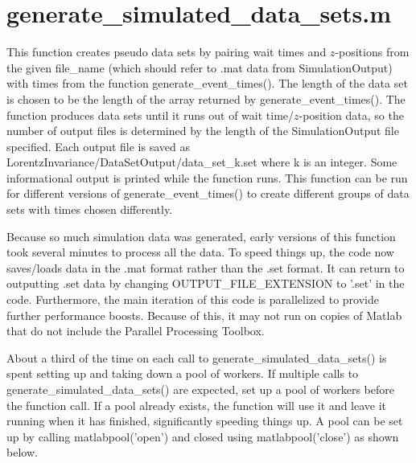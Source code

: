 \documentclass[12pt]{report}
\begin{document}
\section{generate\_simulated\_data\_sets.m}
This function creates pseudo data sets by pairing wait times and $z$-positions from the given file\_name (which should refer to .mat data from SimulationOutput) with times from the function generate\_event\_times().  The length of the data set is chosen to be the length of the array returned by generate\_event\_times().  The function produces data sets until it runs out of wait time/$z$-position data, so the number of output files is determined by the length of the SimulationOutput file specified.  Each output file is saved as LorentzInvariance/DataSetOutput/data\_set\_k.set where k is an integer.  Some informational output is printed while the function runs.  This function can be run for different versions of generate\_event\_times() to create different groups of data sets with times chosen differently.

Because so much simulation data was generated, early versions of this function took several minutes to process all the data.  To speed things up, the code now saves/loads data in the .mat format rather than the .set format.  It can return to outputting .set data by changing OUTPUT\_FILE\_EXTENSION to '.set' in the code.  Furthermore, the main iteration of this code is parallelized to provide further performance boosts.  Because of this, it may not run on copies of Matlab that do not include the Parallel Processing Toolbox.

About a third of the time on each call to generate\_simulated\_data\_sets() is spent setting up and taking down a pool of workers.  If multiple calls to generate\_simulated\_data\_sets() are expected, set up a pool of workers before the function call.  If a pool already exists, the function will use it and leave it running when it has finished, significantly speeding things up.  A pool can be set up by calling matlabpool('open') and closed using matlabpool('close') as shown below.
\end{document}
